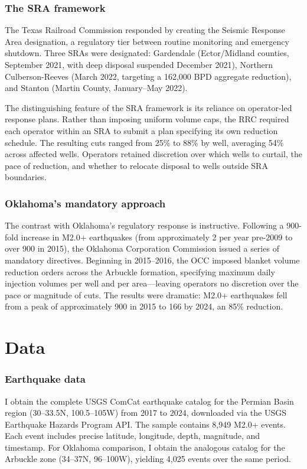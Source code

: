 \documentclass[12pt]{article}
\begin{document}
\subsubsection*{The SRA framework} The Texas Railroad Commission responded by creating the Seismic Response Area designation, a regulatory tier between routine monitoring and emergency shutdown. Three SRAs were designated: Gardendale (Ector/Midland counties, September 2021, with deep disposal suspended December 2021), Northern Culberson-Reeves (March 2022, targeting a 162,000 BPD aggregate reduction), and Stanton (Martin County, January--May 2022).

The distinguishing feature of the SRA framework is its reliance on operator-led response plans. Rather than imposing uniform volume caps, the RRC required each operator within an SRA to submit a plan specifying its own reduction schedule. The resulting cuts ranged from 25\% to 88\% by well, averaging 54\% across affected wells. Operators retained discretion over which wells to curtail, the pace of reduction, and whether to relocate disposal to wells outside SRA boundaries.

\subsubsection*{Oklahoma's mandatory approach} The contrast with Oklahoma's regulatory response is instructive. Following a 900-fold increase in M2.0+ earthquakes (from approximately 2 per year pre-2009 to over 900 in 2015), the Oklahoma Corporation Commission issued a series of mandatory directives. Beginning in 2015--2016, the OCC imposed blanket volume reduction orders across the Arbuckle formation, specifying maximum daily injection volumes per well and per area---leaving operators no discretion over the pace or magnitude of cuts. The results were dramatic: M2.0+ earthquakes fell from a peak of approximately 900 in 2015 to 166 by 2024, an 85\% reduction.

\section{Data}

\subsubsection*{Earthquake data} I obtain the complete USGS ComCat earthquake catalog for the Permian Basin region (30--33.5\textdegree N, 100.5--105\textdegree W) from 2017 to 2024, downloaded via the USGS Earthquake Hazards Program API. The sample contains 8,949 M2.0+ events. Each event includes precise latitude, longitude, depth, magnitude, and timestamp. For Oklahoma comparison, I obtain the analogous catalog for the Arbuckle zone (34--37\textdegree N, 96--100\textdegree W), yielding 4,025 events over the same period.
\end{document}
